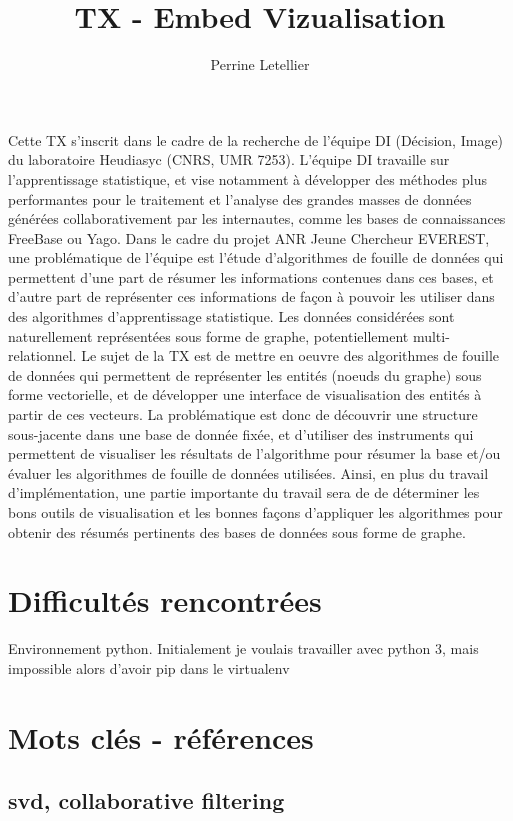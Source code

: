 \documentclass[a4paper]{article}
\title{TX - Embed Vizualisation}
\author{Perrine Letellier}
\begin{document}
\maketitle 



Cette TX s'inscrit dans le cadre de la recherche de l'équipe DI (Décision, Image) du laboratoire Heudiasyc (CNRS, UMR 7253). L'équipe DI travaille sur l'apprentissage statistique, et vise notamment à développer des méthodes plus performantes pour le traitement et l'analyse des grandes masses de données générées collaborativement par les internautes, comme les bases de connaissances FreeBase ou Yago. Dans le cadre du projet ANR Jeune Chercheur EVEREST, une problématique de l'équipe est l'étude d'algorithmes de fouille de données qui permettent d'une part de résumer les informations contenues dans ces bases, et d'autre part de représenter ces informations de façon à pouvoir les utiliser dans des algorithmes d'apprentissage statistique. Les données considérées sont naturellement représentées sous forme de graphe, potentiellement multi-relationnel. Le sujet de la TX est de mettre en oeuvre des algorithmes de fouille de données qui permettent de représenter les entités (noeuds du graphe) sous forme vectorielle, et de développer une interface de visualisation des entités à partir de ces vecteurs. La problématique est donc de découvrir une structure sous-jacente dans une base de donnée fixée, et d'utiliser des instruments qui permettent de visualiser les résultats de l'algorithme pour résumer la base et/ou évaluer les algorithmes de fouille de données utilisées. Ainsi, en plus du travail d'implémentation, une partie importante du travail sera de de déterminer les bons outils de visualisation et les bonnes façons d'appliquer les algorithmes pour obtenir des résumés pertinents des bases de données sous forme de graphe. 


\section{Difficultés rencontrées}
Environnement python. Initialement je voulais travailler avec python 3, mais impossible alors d'avoir pip dans le virtualenv


\section{Mots clés - références}
\subsection{svd, collaborative filtering}
\end{document}
